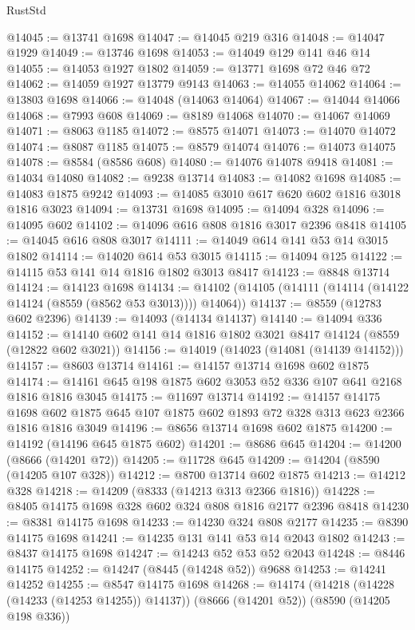 \begin{lexlean}{RustStd}
\begin{coremodule}
@14045 := @13741 @1698
@14047 := @14045 @219 @316
@14048 := @14047 @1929
@14049 := @13746 @1698
@14053 := @14049 @129 @141 @46 @14
@14055 := @14053 @1927 @1802
@14059 := @13771 @1698 @72 @46 @72
@14062 := @14059 @1927 @13779 @9143
@14063 := @14055 @14062
@14064 := @13803 @1698
@14066 := @14048 (@14063 @14064)
@14067 := @14044 @14066
@14068 := @7993 @608
@14069 := @8189 @14068
@14070 := @14067 @14069
@14071 := @8063 @1185
@14072 := @8575 @14071
@14073 := @14070 @14072
@14074 := @8087 @1185
@14075 := @8579 @14074
@14076 := @14073 @14075
@14078 := @8584 (@8586 @608)
@14080 := @14076 @14078 @9418
@14081 := @14034 @14080
@14082 := @9238 @13714
@14083 := @14082 @1698
@14085 := @14083 @1875 @9242
@14093 := @14085 @3010 @617 @620 @602 @1816 @3018 @1816 @3023
@14094 := @13731 @1698
@14095 := @14094 @328
@14096 := @14095 @602
@14102 := @14096 @616 @808 @1816 @3017 @2396 @8418
@14105 := @14045 @616 @808 @3017
@14111 := @14049 @614 @141 @53 @14 @3015 @1802
@14114 := @14020 @614 @53 @3015
@14115 := @14094 @125
@14122 := @14115 @53 @141 @14 @1816 @1802 @3013 @8417
@14123 := @8848 @13714
@14124 := @14123 @1698
@14134 := @14102 (@14105 (@14111 (@14114 (@14122 @14124 (@8559 (@8562 @53 @3013)))) @14064))
@14137 := @8559 (@12783 @602 @2396)
@14139 := @14093 (@14134 @14137)
@14140 := @14094 @336
@14152 := @14140 @602 @141 @14 @1816 @1802 @3021 @8417 @14124 (@8559 (@12822 @602 @3021))
@14156 := @14019 (@14023 (@14081 (@14139 @14152)))
@14157 := @8603 @13714
@14161 := @14157 @13714 @1698 @602 @1875
@14174 := @14161 @645 @198 @1875 @602 @3053 @52 @336 @107 @641 @2168 @1816 @1816 @3045
@14175 := @11697 @13714
@14192 := @14157
    @14175
    @1698
    @602
    @1875
    @645
    @107
    @1875
    @602
    @1893
    @72
    @328
    @313
    @623
    @2366
    @1816
    @1816
    @3049
@14196 := @8656 @13714 @1698 @602 @1875
@14200 := @14192 (@14196 @645 @1875 @602)
@14201 := @8686 @645
@14204 := @14200 (@8666 (@14201 @72))
@14205 := @11728 @645
@14209 := @14204 (@8590 (@14205 @107 @328))
@14212 := @8700 @13714 @602 @1875
@14213 := @14212 @328
@14218 := @14209 (@8333 (@14213 @313 @2366 @1816))
@14228 := @8405 @14175 @1698 @328 @602 @324 @808 @1816 @2177 @2396 @8418
@14230 := @8381 @14175 @1698
@14233 := @14230 @324 @808 @2177
@14235 := @8390 @14175 @1698
@14241 := @14235 @131 @141 @53 @14 @2043 @1802
@14243 := @8437 @14175 @1698
@14247 := @14243 @52 @53 @52 @2043
@14248 := @8446 @14175
@14252 := @14247 (@8445 (@14248 @52)) @9688
@14253 := @14241 @14252
@14255 := @8547 @14175 @1698
@14268 := @14174
    (@14218 (@14228 (@14233 (@14253 @14255)) @14137))
    (@8666 (@14201 @52))
    (@8590 (@14205 @198 @336))

\end{coremodule}
\end{lexlean}
